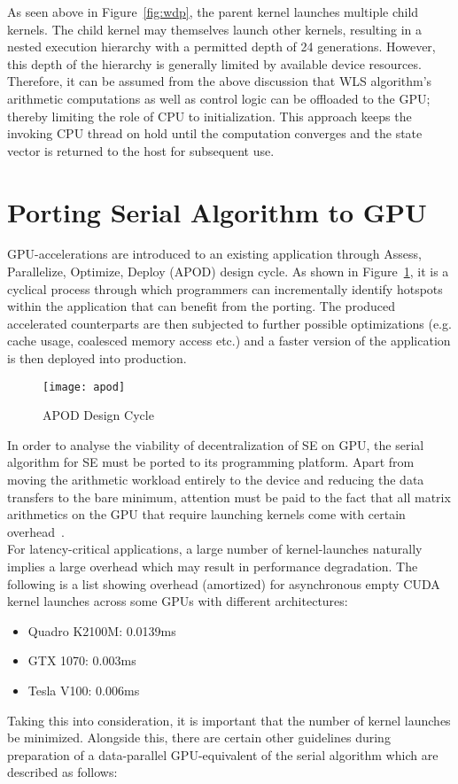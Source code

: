 \documentclass[thesis.tex]{subfiles}
\begin{document}
As seen above in Figure~\ref{fig:wdp}, the parent kernel launches multiple child kernels. The child kernel may themselves launch other kernels, resulting in a nested execution hierarchy with a permitted depth of 24 generations. However, this depth of the hierarchy is generally limited by available device resources.\\
Therefore, it can be assumed from the above discussion that WLS algorithm’s arithmetic computations as well as control logic can be offloaded to the GPU; thereby limiting the role of CPU to initialization. This approach keeps the invoking CPU thread on hold until the computation converges and the state vector is returned to the host for subsequent use.


\section{Porting Serial Algorithm to GPU}\label{porting}
GPU-accelerations are introduced to an existing application through Assess, Parallelize, Optimize, Deploy (APOD) design cycle. As shown in Figure~\ref{fig:apod}, it is a cyclical process through which programmers can incrementally identify hotspots within the application that can benefit from the porting. The produced accelerated counterparts are then subjected to further possible optimizations (e.g. cache usage, coalesced memory access etc.) and a faster version of the application is then deployed into production.\\
\begin{figure}[H]
	\centering
	\texttt{[image: apod]}
	\caption{APOD Design Cycle}
	\label{fig:apod}
\end{figure}
In order to analyse the viability of decentralization of SE on GPU, the serial algorithm for SE must be ported to its programming platform. Apart from moving the arithmetic workload entirely to the device and reducing the data transfers to the bare minimum, attention must be paid to the fact that all matrix arithmetics on the GPU that require launching kernels come with certain overhead~\cite{kernelOverhead}. \\
For latency-critical applications, a large number of kernel-launches naturally implies a large overhead which may result in performance degradation. The following is a list showing overhead (amortized) for asynchronous empty CUDA kernel launches across some GPUs with different architectures:
\begin{itemize}
	\item Quadro K2100M: 0.0139ms
	\item GTX 1070: 0.003ms
	\item Tesla V100: 0.006ms
\end{itemize}
Taking this into consideration, it is important that the number of kernel launches be minimized. Alongside this, there are certain other guidelines during preparation of a data-parallel GPU-equivalent of the serial algorithm which are described as follows:
\end{document}
